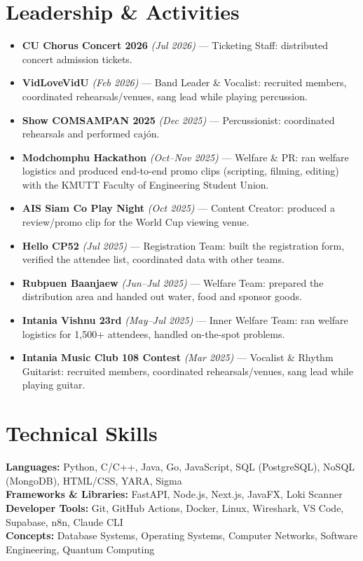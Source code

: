 \documentclass[11pt,a4paper]{article}
\begin{document}
\section{Leadership \& Activities}
\begin{itemize}
  \item \textbf{CU Chorus Concert 2026} \textit{(Jul 2026)} --- Ticketing Staff: distributed concert admission tickets.
  \item \textbf{VidLoveVidU} \textit{(Feb 2026)} --- Band Leader \& Vocalist: recruited members, coordinated rehearsals/venues, sang lead while playing percussion.
  \item \textbf{Show COMSAMPAN 2025} \textit{(Dec 2025)} --- Percussionist: coordinated rehearsals and performed caj\'on.
  \item \textbf{Modchomphu Hackathon} \textit{(Oct--Nov 2025)} --- Welfare \& PR: ran welfare logistics and produced end-to-end promo clips (scripting, filming, editing) with the KMUTT Faculty of Engineering Student Union.
  \item \textbf{AIS Siam Co Play Night} \textit{(Oct 2025)} --- Content Creator: produced a review/promo clip for the World Cup viewing venue.
  \item \textbf{Hello CP52} \textit{(Jul 2025)} --- Registration Team: built the registration form, verified the attendee list, coordinated data with other teams.
  \item \textbf{Rubpuen Baanjaew} \textit{(Jun--Jul 2025)} --- Welfare Team: prepared the distribution area and handed out water, food and sponsor goods.
  \item \textbf{Intania Vishnu 23rd} \textit{(May--Jul 2025)} --- Inner Welfare Team: ran welfare logistics for 1,500+ attendees, handled on-the-spot problems.
  \item \textbf{Intania Music Club 108 Contest} \textit{(Mar 2025)} --- Vocalist \& Rhythm Guitarist: recruited members, coordinated rehearsals/venues, sang lead while playing guitar.
\end{itemize}

\section{Technical Skills}
\textbf{Languages:} Python, C/C++, Java, Go, JavaScript, SQL (PostgreSQL), NoSQL (MongoDB), HTML/CSS, YARA, Sigma\\
\textbf{Frameworks \& Libraries:} FastAPI, Node.js, Next.js, JavaFX, Loki Scanner\\
\textbf{Developer Tools:} Git, GitHub Actions, Docker, Linux, Wireshark, VS Code, Supabase, n8n, Claude CLI\\
\textbf{Concepts:} Database Systems, Operating Systems, Computer Networks, Software Engineering, Quantum Computing
\end{document}
